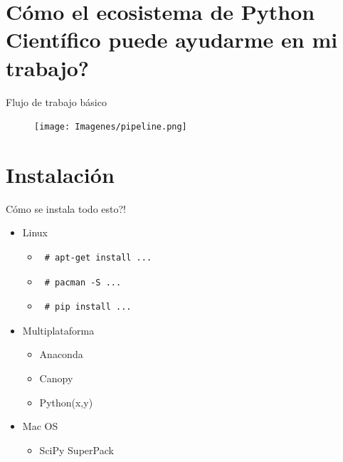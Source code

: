 \documentclass[bigger]{beamer}
\begin{document}
\section{Cómo el ecosistema de Python Científico puede ayudarme en mi trabajo?}
\begin{frame}{Flujo de trabajo básico}
 \begin{figure}[h]
        \texttt{[image: Imagenes/pipeline.png]}
\end{figure}
\end{frame}
\section{Instalación}
\begin{frame}[fragile]{Cómo se instala todo esto?!}
    \begin{itemize}
        \item Linux
        \begin{itemize}
            \item \begin{verbatim} # apt-get install ... \end{verbatim}
            \item \begin{verbatim} # pacman -S ... \end{verbatim}
            \item \begin{verbatim} # pip install ...\end{verbatim}
        \end{itemize}
        \item Multiplataforma
        \begin{itemize}
            \item Anaconda
            \item Canopy
            \item Python(x,y)
        \end{itemize}
        \item Mac OS
        \begin{itemize}
            \item SciPy SuperPack
        \end{itemize}
    \end{itemize}
\end{frame}
\end{document}
